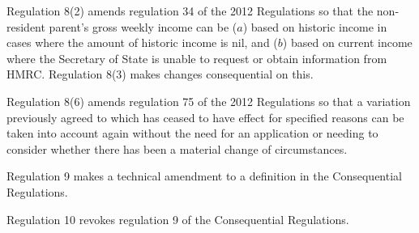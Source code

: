 \documentclass[12pt,a4paper]{article}
\begin{document}
Regulation 8(2) amends regulation 34 of the 2012 Regulations so that the non-resident parent’s gross weekly income can be ($a$)  based on historic income in cases where the amount of historic income is nil, and ($b$)  based on current income where the Secretary of State is unable to request or obtain information from HMRC. Regulation 8(3) makes changes consequential on this.

Regulation 8(6) amends regulation 75 of the 2012 Regulations so that a variation previously agreed to which has ceased to have effect for specified reasons can be taken into account again without the need for an application or needing to consider whether there has been a material change of circumstances.

Regulation 9 makes a technical amendment to a definition in the Consequential Regulations.

Regulation 10 revokes regulation 9 of the Consequential Regulations. 
\end{document}
